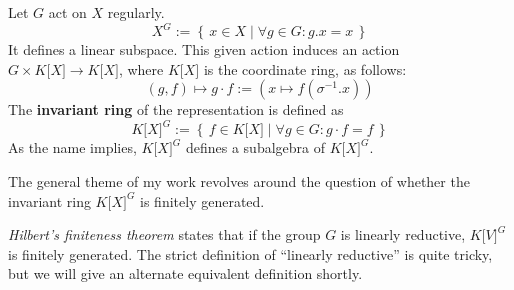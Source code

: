 \begin{definition}[Invariants]
  Let $ G $ act on $ X $ regularly.
  \begin{equation}
    X^G := \left\{\, x \in X \mid \forall g \in G : g . x = x \,\right\}
  \end{equation}
  It defines a linear subspace.
  This given action induces an action $ G \times K\lbrack X\rbrack \longrightarrow K\lbrack X\rbrack $, where $K\lbrack X\rbrack$ is the coordinate ring, as follows:
  \begin{equation}
    \left( g , f \right) \longmapsto g \cdot f :=
    \left( x \mapsto f \left( \sigma^{-1} . x \right) \right)
  \end{equation}
  The \textbf{invariant ring} of the representation is defined as
  \begin{equation}
    K\lbrack X\rbrack^G := \left\{ \, f \in K\lbrack X \rbrack \mid \forall g \in G : g \cdot f = f \, \right\}
  \end{equation}
  As the name implies, $ K\lbrack X\rbrack^G $ defines a subalgebra of $ K\lbrack X\rbrack^G $.
\end{definition}

The general theme of my work revolves around the question of whether the invariant ring $ K\lbrack X\rbrack^G $ is finitely generated.

\textit{Hilbert's finiteness theorem} states that if the group $G$ is linearly reductive, $ K\lbrack V\rbrack^G $ is finitely generated.
The strict definition of ``linearly reductive'' is quite tricky, but we will give an alternate equivalent definition shortly.

